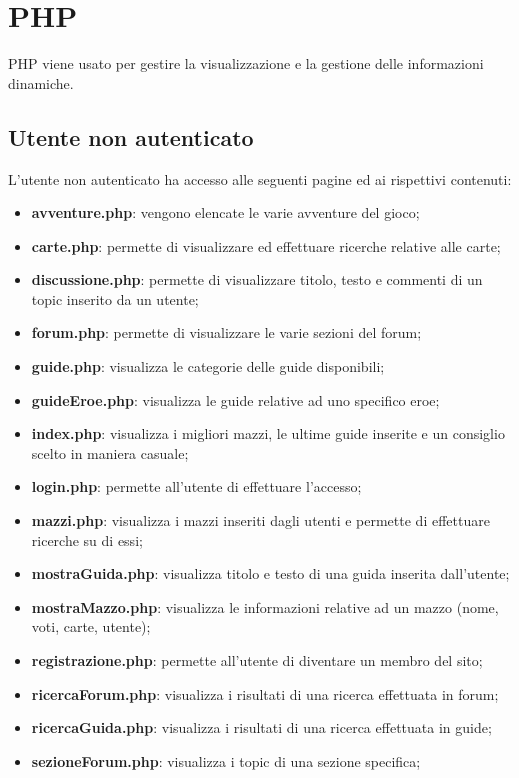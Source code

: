 \section{PHP}
PHP viene usato per gestire la visualizzazione e la gestione delle informazioni dinamiche.

\subsection{Utente non autenticato}
L'utente non autenticato ha accesso alle seguenti pagine ed ai rispettivi contenuti:
\begin{itemize}
	\item \textbf{avventure.php}: vengono elencate le varie avventure del gioco;
	\item \textbf{carte.php}: permette di visualizzare ed effettuare ricerche relative alle carte;
	\item \textbf{discussione.php}: permette di visualizzare titolo, testo e commenti di un topic inserito da un utente;
	\item \textbf{forum.php}: permette di visualizzare le varie sezioni del forum;
	\item \textbf{guide.php}: visualizza le categorie delle guide disponibili;
	\item \textbf{guideEroe.php}: visualizza le guide relative ad uno specifico eroe;
	\item \textbf{index.php}: visualizza i migliori mazzi, le ultime guide inserite e un consiglio scelto in maniera casuale;
	\item \textbf{login.php}: permette all'utente di effettuare l'accesso;
	\item \textbf{mazzi.php}: visualizza i mazzi inseriti dagli utenti e permette di effettuare ricerche su di essi;
	\item \textbf{mostraGuida.php}: visualizza titolo e testo di una guida inserita dall'utente;
	\item \textbf{mostraMazzo.php}: visualizza le informazioni relative ad un mazzo (nome, voti, carte, utente);
	\item \textbf{registrazione.php}: permette all'utente di diventare un membro del sito;
	\item \textbf{ricercaForum.php}: visualizza i risultati di una ricerca effettuata in forum;
	\item \textbf{ricercaGuida.php}: visualizza i risultati di una ricerca effettuata in guide;
	\item \textbf{sezioneForum.php}: visualizza i topic di una sezione specifica;
\end{itemize}

